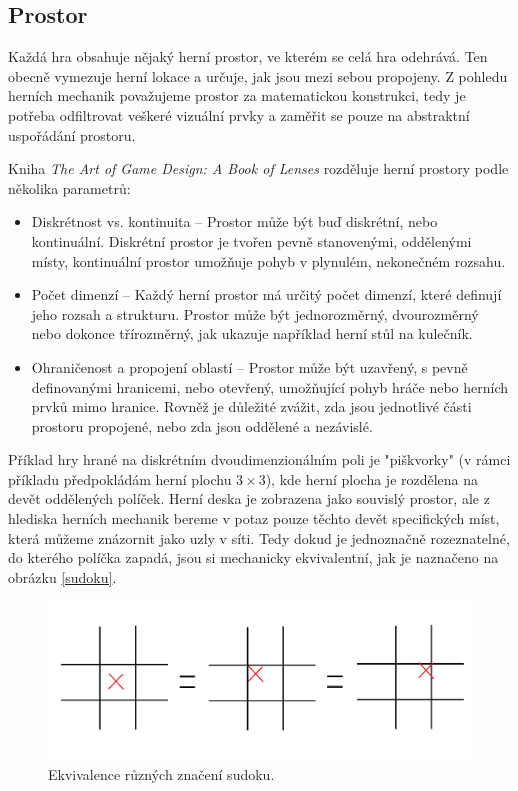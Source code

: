 \subsection{Prostor}

Každá hra obsahuje nějaký herní prostor, ve kterém se celá hra odehrává. Ten obecně vymezuje herní lokace a určuje, jak jsou mezi sebou propojeny. Z pohledu herních mechanik považujeme prostor za matematickou konstrukci, tedy je potřeba odfiltrovat veškeré vizuální prvky a zaměřit se pouze na abstraktní uspořádání prostoru.

Kniha \textit{The Art of Game Design: A Book of Lenses} rozděluje herní prostory podle několika parametrů:

\begin{itemize}
    \item Diskrétnost vs. kontinuita -- Prostor může být buď diskrétní, nebo kontinuální. Diskrétní prostor je tvořen pevně stanovenými, oddělenými místy, kontinuální prostor umožňuje pohyb v plynulém, nekonečném rozsahu.
    \item Počet dimenzí -- Každý herní prostor má určitý počet dimenzí, které definují jeho rozsah a strukturu. Prostor může být jednorozměrný, dvourozměrný nebo dokonce třírozměrný, jak ukazuje například herní stůl na kulečník.
    \item Ohraničenost a propojení oblastí -- Prostor může být uzavřený, s pevně definovanými hranicemi, nebo otevřený, umožňující pohyb hráče nebo herních prvků mimo hranice. Rovněž je důležité zvážit, zda jsou jednotlivé části prostoru propojené, nebo zda jsou oddělené a nezávislé.
\end{itemize}

Příklad hry hrané na diskrétním dvoudimenzionálním poli je "piškvorky" (v rámci příkladu předpokládám herní plochu $3\times3$), kde herní plocha je rozdělena na devět oddělených políček. Herní deska je zobrazena jako souvislý prostor, ale z hlediska herních mechanik bereme v potaz pouze těchto devět specifických míst, která můžeme znázornit jako uzly v síti. Tedy dokud je jednoznačně rozeznatelné, do kterého políčka zapadá, jsou si mechanicky ekvivalentní, jak je naznačeno na obrázku \vref{sudoku}.

\begin{figure}
  \centering      %
  \includegraphics[scale=0.3]{obr/sudoku.png} %
  \caption{Ekvivalence různých značení sudoku.} %
  \label{sudoku} %
\end{figure}

